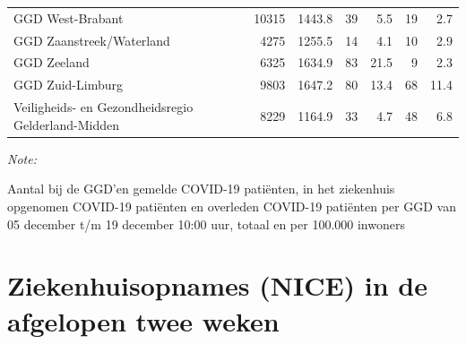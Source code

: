 \documentclass[
  english,
  man,floatsintext]{apa6}
\begin{document}
\begin{table}
\begin{threeparttable}
\begin{tabular}{lrrrrrr}
GGD West-Brabant & 10315 & 1443.8 & 39 & 5.5 & 19 & 2.7\\
GGD Zaanstreek/Waterland & 4275 & 1255.5 & 14 & 4.1 & 10 & 2.9\\
GGD Zeeland & 6325 & 1634.9 & 83 & 21.5 & 9 & 2.3\\
GGD Zuid-Limburg & 9803 & 1647.2 & 80 & 13.4 & 68 & 11.4\\
Veiligheids- en Gezondheidsregio Gelderland-Midden & 8229 & 1164.9 & 33 & 4.7 & 48 & 6.8\\
\bottomrule
\end{tabular}
\begin{tablenotes}
\item \textit{Note: } 
\item Aantal bij de GGD’en gemelde COVID-19 patiënten, in het ziekenhuis opgenomen COVID-19 patiënten en overleden COVID-19 patiënten per GGD van 05 december t/m 19 december 10:00 uur, totaal en per 100.000 inwoners
\end{tablenotes}
\end{threeparttable}
\endgroup{}
\end{table}

\newpage

\hypertarget{ziekenhuisopnames-nice-in-de-afgelopen-twee-weken}{%
\section{Ziekenhuisopnames (NICE) in de afgelopen twee weken}\label{ziekenhuisopnames-nice-in-de-afgelopen-twee-weken}}
\end{document}

